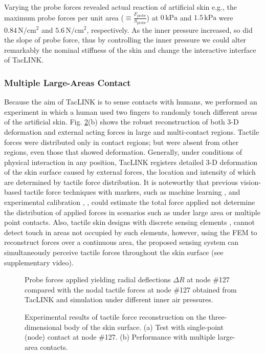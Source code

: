 \documentclass[10pt,letterpaper,journal,final,twoside,twocolumn,nofonttune]{IEEEtran}
\begin{document}
Varying the probe forces revealed actual reaction of artificial skin e.g., the maximum probe forces per unit area ($\equiv\frac{F_{\text{probe}}}{S_{\text{probe}}}$) at $0\,\text{kPa}$ and $1.5\,\text{kPa}$ were $0.84\,\text{N}/\text{cm}^2$ and $5.6\,\text{N}/\text{cm}^2$, respectively. As the inner pressure increased, so did the slope of probe force, thus by controlling the inner pressure we could alter remarkably the nominal stiffness of the skin and change the interactive interface of TacLINK. 
\subsubsection{Multiple Large-Areas Contact}
Because the aim of TacLINK is to sense contacts with humans, we performed an experiment in which a human used two fingers to randomly touch different areas of the artificial skin. Fig. \ref{fig_reconstruction}(b) shows the robust reconstruction of both 3-D deformation and external acting forces in large and multi-contact regions. Tactile forces were distributed only in contact regions; but were absent from other regions, even those that showed deformation. Generally, under conditions of physical interaction in any position, TacLINK registers detailed 3-D deformation of the skin surface caused by external forces, the location and intensity of which are determined by tactile force distribution. It is noteworthy that previous vision-based tactile force techniques with markers, such as machine learning \cite{Yuan}, and experimental calibration \cite{Sato}, \cite{Ito}, could estimate the total force applied not determine the distribution of applied forces in scenarios such as under large area or multiple point contacts. Also, tactile skin designs with discrete sensing elements \cite{Schmitz}, \cite{Philipp} cannot detect touch in areas not occupied by such elements, however, using the FEM to reconstruct forces over a continuous area, the proposed sensing system can simultaneously perceive tactile forces throughout the skin surface (see supplementary video).
\begin{figure}[!t]
\def\svgwidth{1\columnwidth}

\caption{Probe forces applied yielding radial deflections $\Delta{R}$ at node \#127 compared with the nodal tactile forces at node \#127 obtained from TacLINK and simulation under different inner air pressures.}
\label{fig_exp_force}
\end{figure}
\begin{figure}[!t]
\def\svgwidth{1\columnwidth}

\caption{Experimental results of tactile force reconstruction on the three-dimensional body of the skin surface. (a) Test with single-point (node) contact at node \#127. (b) Performance with multiple large-area contacts.}
\label{fig_reconstruction}
\end{figure}
\end{document}
